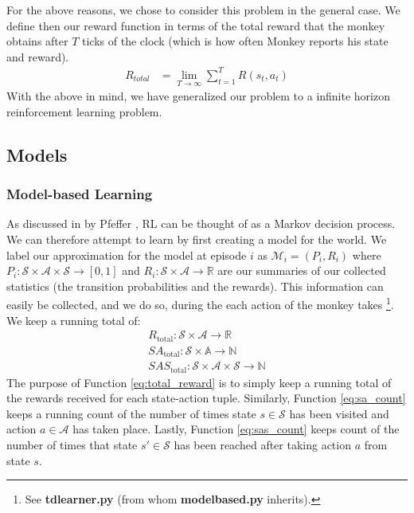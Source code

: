 \documentclass[letterpaper]{article}
\begin{document}
For the above reasons, we chose to consider this problem in the general case. We define then our reward function in terms of the total reward that the monkey obtains after $T$ ticks of the clock (which is how often Monkey reports his state and reward).
\begin{align}
R_{total} &= \lim_{T \to \infty} \sum_{t=1}^T R(s_t,a_t)
\end{align}
With the above in mind, we have generalized our problem to a infinite horizon reinforcement learning problem.


\subsection{Models}
\subsubsection{Model-based Learning}
\label{sec:model-based_learning}

As discussed in by Pfeffer \cite{mdp_lecture}, RL can be thought of as a Markov decision process. We can therefore attempt to learn by first creating a model for the world. We label our approximation for the model at episode $i$ as $\mathcal{M}_i = (P_i,R_i)$ where $P_i: \mathcal{S} \times \mathcal{A} \times \mathcal{S} \to [0,1]$ and $R_i: \mathcal{S} \times \mathcal{A} \to \mathbb{R}$ are our summaries of our collected statistics (the transition probabilities and the rewards). This information can easily be collected, and we do so, during the each action of the monkey takes \footnote{See \textbf{tdlearner.py} (from whom \textbf{modelbased.py} inherits).}. We keep a running total of:
\begin{align}
R_{\text{total}}: \mathcal{S} \times \mathcal{A} \to \mathbb{R} \label{eq:total_reward}\\
SA_{\text{total}}: \mathcal{S} \times \mathbb{A} \to \mathbb{N}\label{eq:sa_count} \\
SAS_{\text{total}}: \mathcal{S} \times \mathcal{A} \times \mathcal{S} \to \mathbb{N} \label{eq:sas_count}
\end{align}
The purpose of Function \ref{eq:total_reward} is to simply keep a running total of the rewards received for each state-action tuple. Similarly, Function \ref{eq:sa_count} keeps a running count of the number of times state $s \in \mathcal{S}$ has been visited and action $a \in \mathcal{A}$ has taken place. Lastly, Function \ref{eq:sas_count} keeps count of the number of times that state $s' \in \mathcal{S}$ has been reached after taking action $a$ from state $s$. \\
\end{document}
